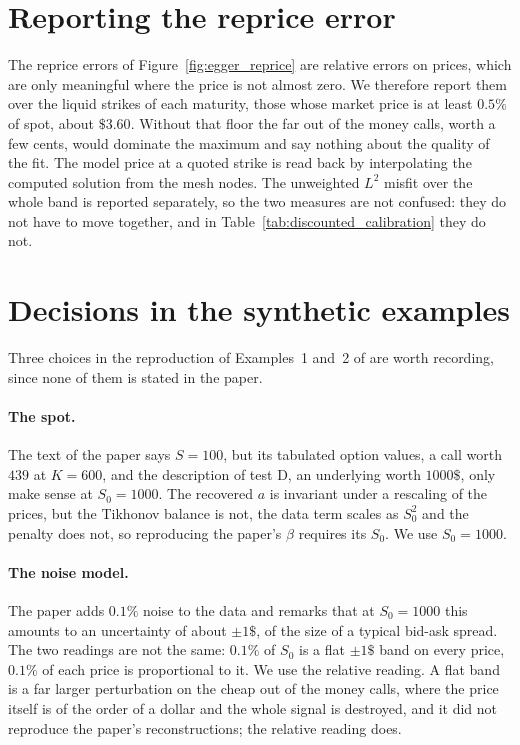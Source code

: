\section{Reporting the reprice error}
\label{subsec:reprice_metric}

The reprice errors of Figure~\ref{fig:egger_reprice} are relative errors on prices, which are
only meaningful where the price is not almost zero. We therefore report them over the liquid
strikes of each maturity, those whose market price is at least $0.5\%$ of spot, about $\$3.60$.
Without that floor the far out of the money calls, worth a few cents, would dominate the
maximum and say nothing about the quality of the fit. The model price at a quoted strike is
read back by interpolating the computed solution from the mesh nodes. The unweighted $L^2$
misfit over the whole band is reported separately, so the two measures are not confused: they
do not have to move together, and in Table~\ref{tab:discounted_calibration} they do not.

\section{Decisions in the synthetic examples}
\label{subsec:synthetic_decisions}

Three choices in the reproduction of Examples~1 and~2 of \cite{egger2005tikhonov} are worth
recording, since none of them is stated in the paper.

\paragraph{The spot.} The text of the paper says $S = 100$, but its tabulated option values, a
call worth $439$ at $K = 600$, and the description of test D, an underlying worth $1000\$$,
only make sense at $S_0 = 1000$. The recovered $a$ is invariant under a rescaling of the
prices, but the Tikhonov balance is not, the data term scales as $S_0^2$ and the penalty does
not, so reproducing the paper's $\beta$ requires its $S_0$. We use $S_0 = 1000$.

\paragraph{The noise model.} The paper adds $0.1\%$ noise to the data and remarks that at
$S_0 = 1000$ this amounts to an uncertainty of about $\pm 1\$$, of the size of a typical
bid-ask spread. The two readings are not the same: $0.1\%$ of $S_0$ is a flat $\pm 1\$$ band on
every price, $0.1\%$ of each price is proportional to it. We use the relative reading. A flat
band is a far larger perturbation on the cheap out of the money calls, where the price itself
is of the order of a dollar and the whole signal is destroyed, and it did not reproduce the
paper's reconstructions; the relative reading does.

